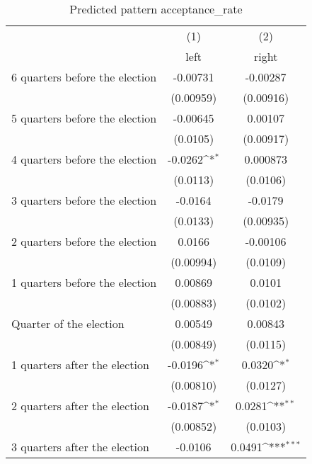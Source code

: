 \begin{table}[htbp]\centering
\def\sym#1{\ifmmode^{#1}\else\(^{#1}\)\fi}
\caption{Predicted pattern acceptance\_rate}
\begin{tabular}{l*{2}{c}}
\hline\hline
                    &\multicolumn{1}{c}{(1)}&\multicolumn{1}{c}{(2)}\\
                    &\multicolumn{1}{c}{left}&\multicolumn{1}{c}{right}\\
\hline
 6 quarters before the election&    -0.00731         &    -0.00287         \\
                    &   (0.00959)         &   (0.00916)         \\
[1em]
 5 quarters before the election&    -0.00645         &     0.00107         \\
                    &    (0.0105)         &   (0.00917)         \\
[1em]
 4 quarters before the election&     -0.0262\sym{*}  &    0.000873         \\
                    &    (0.0113)         &    (0.0106)         \\
[1em]
 3 quarters before the election&     -0.0164         &     -0.0179         \\
                    &    (0.0133)         &   (0.00935)         \\
[1em]
 2 quarters before the election&      0.0166         &    -0.00106         \\
                    &   (0.00994)         &    (0.0109)         \\
[1em]
 1 quarters before the election&     0.00869         &      0.0101         \\
                    &   (0.00883)         &    (0.0102)         \\
[1em]
Quarter of the election&     0.00549         &     0.00843         \\
                    &   (0.00849)         &    (0.0115)         \\
[1em]
 1 quarters after the election&     -0.0196\sym{*}  &      0.0320\sym{*}  \\
                    &   (0.00810)         &    (0.0127)         \\
[1em]
 2 quarters after the election&     -0.0187\sym{*}  &      0.0281\sym{**} \\
                    &   (0.00852)         &    (0.0103)         \\
[1em]
 3 quarters after the election&     -0.0106         &      0.0491\sym{***}\\

\end{tabular}
\end{table}
